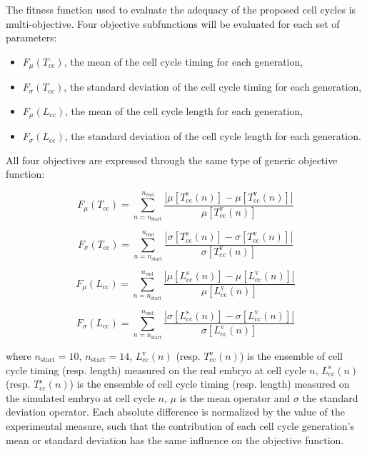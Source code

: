 The fitness function used to evaluate the adequacy of the proposed cell cycles is multi-objective. Four objective subfunctions will be evaluated for each set of parameters:
\begin{itemize}
	\item $F_{\mu}(T_{\mathrm{cc}})$, the mean of the cell cycle timing for each generation,
	\item $F_{\sigma}(T_{\mathrm{cc}})$, the standard deviation of the cell cycle timing for each generation,
	\item $F_{\mu}(L_{\mathrm{cc}})$, the mean of the cell cycle length for each generation,
	\item $F_{\sigma}(L_{\mathrm{cc}})$, the standard deviation of the cell cycle length for each generation.
\end{itemize}

All four objectives are expressed through the same type of generic objective function:

$$F_{\mu}(T_{\mathrm{cc}}) = \sum_{n=n_{\mathrm{start}}}^{n_{\mathrm{end}}} \frac{ \left | \mu[T_{\mathrm{cc}}^{\mathrm{s}}(n)] - \mu[T_{\mathrm{cc}}^{\mathrm{v}}(n)] \right |}{\mu[T_{\mathrm{cc}}^{\mathrm{v}}(n)]}$$

$$F_{\sigma}(T_{\mathrm{cc}}) = \sum_{n=n_{\mathrm{start}}}^{n_{\mathrm{end}}} \frac{ \left | \sigma[T_{\mathrm{cc}}^{\mathrm{s}}(n)] - \sigma[T_{\mathrm{cc}}^{\mathrm{v}}(n)] \right |}{\sigma[T_{\mathrm{cc}}^{\mathrm{v}}(n)]}$$

$$F_{\mu}(L_{\mathrm{cc}}) = \sum_{n=n_{\mathrm{start}}}^{n_{\mathrm{end}}} \frac{ \left | \mu[L_{\mathrm{cc}}^{\mathrm{s}}(n)] - \mu[L_{\mathrm{cc}}^{\mathrm{v}}(n)] \right |}{\mu[L_{\mathrm{cc}}^{\mathrm{v}}(n)]}$$

$$F_{\sigma}(L_{\mathrm{cc}}) = \sum_{n=n_{\mathrm{start}}}^{n_{\mathrm{end}}} \frac{ \left | \sigma[L_{\mathrm{cc}}^{\mathrm{s}}(n)] - \sigma[L_{\mathrm{cc}}^{\mathrm{v}}(n)] \right |}{\sigma[L_{\mathrm{cc}}^{\mathrm{v}}(n)]}$$

where $n_{\mathrm{start}}=10$, $n_{\mathrm{start}}=14$, $L_{\mathrm{cc}}^{\mathrm{v}}(n)$ (resp. $T_{\mathrm{cc}}^{\mathrm{v}}(n)$) is the ensemble of cell cycle timing (resp. length) measured on the real embryo at cell cycle $n$, $L_{\mathrm{cc}}^{\mathrm{s}}(n)$ (resp. $T_{\mathrm{cc}}^{\mathrm{s}}(n)$) is the ensemble of cell cycle timing (resp. length) measured on the simulated embryo at cell cycle $n$, $\mu$ is the mean operator and $\sigma$ the standard deviation operator. Each absolute difference is normalized by the value of the experimental measure, such that the contribution of each cell cycle generation's mean or standard deviation has the same influence on the objective function.

